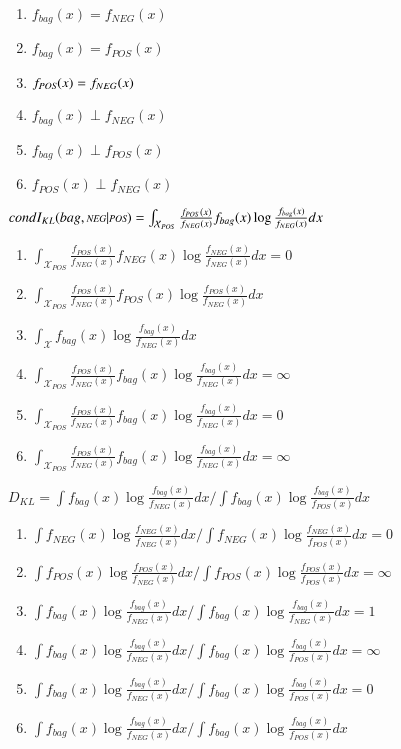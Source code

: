 \begin{enumerate}
  \item $f_{bag}(x) = f_{NEG}(x)$
  \item $f_{bag}(x) = f_{POS}(x)$
  \item $f_{\text{\scriptsize{{\it POS}}}}(x) = f_{NEG}(x)$
  \item $f_{bag}(x) \perp f_{NEG}(x)$
  \item $f_{bag}(x) \perp f_{POS}(x)$
  \item $f_{POS}(x) \perp f_{NEG}(x)$
\end{enumerate}
$condI_{KL}(bag,\text{\scriptsize{{\it NEG}}}|\text{\scriptsize{{\it POS}}}) = \int_{\mathcal{X}_{POS}} \frac{f_{POS}(x)}{f_{NEG}(x)} f_{bag}(x) \log \frac{f_{bag}(x)}{f_{NEG}(x)} dx$ 
\begin{enumerate}
  \item $ \int_{\mathcal{X}_{POS}} \frac{f_{POS}(x)}{f_{NEG}(x)} f_{NEG}(x) \log \frac{f_{NEG}(x)}{f_{NEG}(x)} dx = 0$ 
  \item $\int_{\mathcal{X}_{POS}} \frac{f_{POS}(x)}{f_{NEG}(x)} f_{POS}(x) \log \frac{f_{POS}(x)}{f_{NEG}(x)} dx$ 
  \item $\int_{\mathcal{X}} f_{bag}(x) \log \frac{f_{bag}(x)}{f_{NEG}(x)} dx$ 
  \item $\int_{\mathcal{X}_{POS}} \frac{f_{POS}(x)}{f_{NEG}(x)} f_{bag}(x) \log \frac{f_{bag}(x)}{f_{NEG}(x)} dx = \infty$ 
  \item $\int_{\mathcal{X}_{POS}} \frac{f_{POS}(x)}{f_{NEG}(x)} f_{bag}(x) \log \frac{f_{bag}(x)}{f_{NEG}(x)} dx = 0$ 
  \item $\int_{\mathcal{X}_{POS}} \frac{f_{POS}(x)}{f_{NEG}(x)} f_{bag}(x) \log \frac{f_{bag}(x)}{f_{NEG}(x)} dx = \infty$ 
\end{enumerate}
$D_{KL} = \int f_{bag}(x) \log \frac{f_{bag}(x)}{f_{NEG}(x)} dx / \int f_{bag}(x) \log \frac{f_{bag}(x)}{f_{POS}(x)} dx$
\begin{enumerate}
  \item $\int f_{NEG}(x) \log \frac{f_{NEG}(x)}{f_{NEG}(x)} dx / \int f_{NEG}(x) \log \frac{f_{NEG}(x)}{f_{POS}(x)} dx = 0$
  \item $ \int f_{POS}(x) \log \frac{f_{POS}(x)}{f_{NEG}(x)} dx / \int f_{POS}(x) \log \frac{f_{POS}(x)}{f_{POS}(x)} dx = \infty$
  \item $\int f_{bag}(x) \log \frac{f_{bag}(x)}{f_{NEG}(x)} dx / \int f_{bag}(x) \log \frac{f_{bag}(x)}{f_{NEG}(x)} dx = 1$
  \item $\int f_{bag}(x) \log \frac{f_{bag}(x)}{f_{NEG}(x)} dx / \int f_{bag}(x) \log \frac{f_{bag}(x)}{f_{POS}(x)} dx = \infty$
  \item $\int f_{bag}(x) \log \frac{f_{bag}(x)}{f_{NEG}(x)} dx / \int f_{bag}(x) \log \frac{f_{bag}(x)}{f_{POS}(x)} dx = 0$
  \item $\int f_{bag}(x) \log \frac{f_{bag}(x)}{f_{NEG}(x)} dx / \int f_{bag}(x) \log \frac{f_{bag}(x)}{f_{POS}(x)} dx$\end{enumerate}